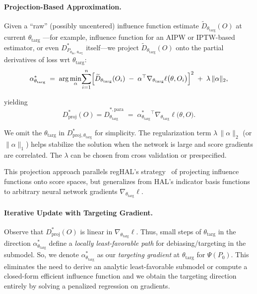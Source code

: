 \documentclass{article}
\theoremstyle{remark}
\begin{document}
\paragraph{Projection-Based Approximation.}
Given a “raw” (possibly uncentered) influence function estimate $\widetilde{D}_{\theta_{\text{targ}}}(O)$ at current $\theta_{\text{targ}}$ ---for example, influence function for an AIPW or IPTW-based estimator, or even $D^*_{P_{\theta_{\text{fix}},\,\theta_{\text{targ}}}}$ itself---we project $\widetilde{D}_{\theta_{\text{targ}}}(O)$ onto the partial derivatives of loss wrt $\theta_{\text{targ}}$:
\begin{align*}
    \alpha^*_{\theta_{\text{targ}}}
  \;=\;
  \arg\min_{\alpha}\!\sum_{i=1}^n 
    \Bigl[\widetilde{D}_{\theta_{\text{targ}}}(O_i)
          \;-\;\alpha^\top \nabla_{\theta_{\text{targ}}}\ell\bigl(\theta,O_i\bigr)\Bigr]^2
  \;+\;\lambda\,\|\alpha\|_2, 
\end{align*}
  
yielding 
\[
  D^*_{\mathrm{proj}}(O)=\hat{D}^{*,\text{para}}_{\theta_{\text{targ}}}
  \;=\;
  \alpha^*_{\theta_{\text{targ}}}\!{}^\top 
  \nabla_{\theta_{\text{targ}}}\ell\bigl(\theta,O\bigr).
\]

We omit the $\theta_{\text{targ}}$ in $D^*_{\mathrm{proj},\theta_{\text{targ}}}$ for simplicity. The regularization term $\lambda\,\|\alpha\|_2$ (or $\|\alpha\|_1$) helps stabilize the solution when the network is large and score gradients are correlated. The $\lambda$ can be chosen from cross validation or prespecified. 

This projection approach parallels regHAL's strategy~\cite{li2025regularized} 
of projecting influence functions onto score spaces, but generalizes from 
HAL's indicator basis functions to arbitrary neural network gradients 
$\nabla_{\theta_{\text{targ}}}\ell$.

\paragraph{Iterative Update with Targeting Gradient.}
Observe that $D^*_{\mathrm{proj}}(O)$ is linear in $\nabla_{\theta_{\text{targ}}}\ell$.  Thus, small steps of $\theta_{\text{targ}}$ in the direction $\alpha^*_{\theta_{\text{targ}}}$
define a \emph{locally least-favorable path} for debiasing/targeting in the submodel. So, we denote $\alpha^*_{\theta_{\text{targ}}}$ as our \emph{targeting gradient} at $\theta_{\text{targ}}$ for $\Psi(P_0)$. This eliminates the need to derive an analytic least-favorable submodel or compute a closed-form efficient influence function and we obtain the targeting direction entirely by solving a penalized regression on gradients.
\end{document}
